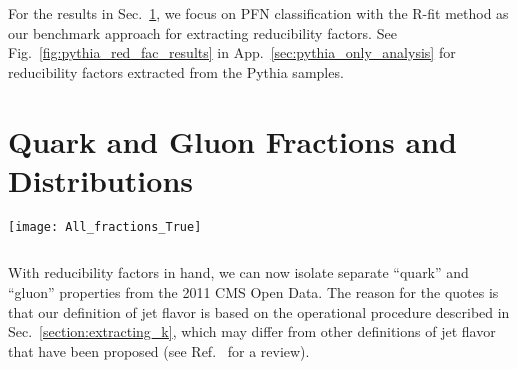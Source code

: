 \documentclass[aps,prd,twocolumn,preprintnumbers,nofootinbib,longbibliography,floatfix]{revtex4-1}
\DeclareRobustCommand{\Sec}[1]{Sec.~\ref{#1}}
\DeclareRobustCommand{\App}[1]{App.~\ref{#1}}
\DeclareRobustCommand{\Fig}[1]{Fig.~\ref{#1}}
\DeclareRobustCommand{\Eq}[1]{Eq.~(\ref{#1})}
\DeclareRobustCommand{\Ref}[1]{Ref.~\cite{#1}}
\newcommand{\Pythia}{{\sc Pythia}\xspace}
\begin{document}
For the results in \Sec{sec:quark_and_gluon_dist}, we focus on PFN classification with the R-fit method as our benchmark approach for extracting reducibility factors.
%
See \Fig{fig:pythia_red_fac_results} in \App{sec:pythia_only_analysis} for reducibility factors extracted from the \Pythia samples.


\section{Quark and Gluon Fractions and Distributions}
\label{sec:quark_and_gluon_dist}

\begin{figure*}[p]
	\texttt{[image: All\_fractions\_True]}
	\caption{
	Extracted quark fractions from the CMS 2011 Open Data with central value unfolding in the forward ($M_1$) and central ($M_2$) samples.
	We focus on the four observables with the best quark/gluon classification performance and compare the anchor bin (blue), L-fit (azure), and R-fit (cyan) methods.
	The benchmark method is indicated in red.
	}
	\label{fig:all_fractions}
\end{figure*}


\begin{figure*}[p]
	$\quad$
	\caption{Statistical correlations for the extracted quark fractions by (a) fixing the PFN observable and sweeping over the reducibility factor method and (b) fixing the R-fit method and sweeping over the four observables in \Fig{fig:all_fractions}.  The diagonal alignment of the ellipses is primarily due to the correlations induced from the $\{\kappa_{12}, \kappa_{21}\} \to \{f_1, f_2\}$ mapping in \Eq{eq:fracs}.
	For the benchmark method in red, the extracted fractions match the CVU expectation in \Eq{eq:quark_fractions_CVU} within the statistical uncertainties (combined with AIC). 
	}
	\label{fig:ellipse_cvu}
\end{figure*}




With reducibility factors in hand, we can now isolate separate ``quark'' and ``gluon'' properties from the 2011 CMS Open Data.
%
The reason for the quotes is that our definition of jet flavor is based on the operational procedure described in \Sec{section:extracting_k}, which may differ from other definitions of jet flavor that have been proposed (see \Ref{Gras:2017jty} for a review).
\end{document}
